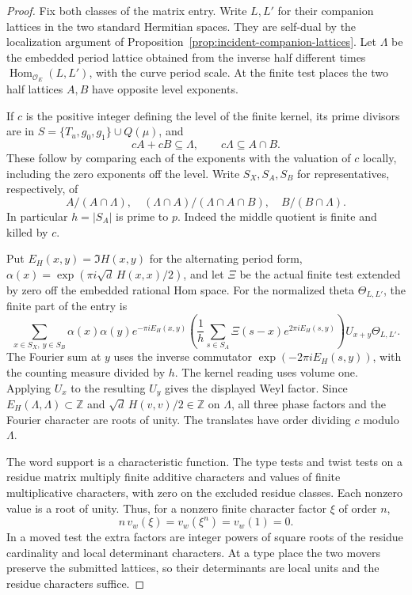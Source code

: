 \begin{proof}

Fix both classes of the matrix entry. Write \(L,L'\) for their
companion lattices in the two standard Hermitian spaces. They are
self-dual by the localization argument of
Proposition~\ref{prop:incident-companion-lattices}. Let \(\Lambda\) be the
embedded period lattice obtained from the inverse half different
times \(\operatorname{Hom}_{\mathcal O_E}(L,L')\), with the
curve period scale. At the finite test places the two half lattices
\(A,B\) have opposite level exponents.

If \(c\) is the positive
integer defining the level of the finite kernel, its prime divisors
are in \(S=\{T_u,g_0,g_1\}\cup Q(\mu)\), and
\[
 cA+cB\subseteq\Lambda,\qquad c\Lambda\subseteq A\cap B.
\]
These follow by comparing each of the exponents with the
valuation of \(c\) locally, including the zero exponents off the
level. Write \(S_X,S_A,S_B\) for representatives, respectively, of
\[
 A/(A\cap\Lambda),\quad
 (\Lambda\cap A)/(\Lambda\cap A\cap B),\quad
 B/(B\cap\Lambda).
\]
In particular \(h=|S_A|\) is prime to \(p\). Indeed the middle
quotient is finite and killed by \(c\).


Put \(E_H(x,y)=\Im H(x,y)\) for the alternating period form,
\(\alpha(x)=\exp(\pi i\sqrt d\, H(x,x)/2)\), and let
\(\Xi\) be the actual finite test extended by zero off the
embedded rational Hom space. For the normalized theta
\(\Theta_{L,L'}\), the finite part of the entry is
\begin{equation}\label{eq:unserved-reader}
 \sum_{x\in S_X,\ y\in S_B}
   \alpha(x)\alpha(y)e^{-\pi i E_H(x,y)}
   \left(\frac1h\sum_{s\in S_A}
      \Xi(s-x)e^{2\pi i E_H(s,y)}\right) U_{x+y}\Theta_{L,L'} .
\end{equation}
The Fourier sum at \(y\) uses the inverse commutator \(\exp(-2\pi i E_H(s,y))\), with the counting
measure divided by \(h\). The kernel reading uses volume one.
Applying \(U_x\) to the resulting \(U_y\) gives the displayed
Weyl factor. Since \(E_H(\Lambda,\Lambda)\subset\mathbb Z\)
and \(\sqrt d\,H(v,v)/2\in\mathbb Z\) on \(\Lambda\), all three
phase factors and the Fourier character are roots of unity.
The translates have order dividing \(c\) modulo \(\Lambda\).


The word support is
a characteristic function. The type tests and twist tests on
a residue matrix multiply finite additive characters and values
of finite multiplicative characters, with zero on the excluded
residue classes. Each nonzero value is a root of unity.
Thus, for a nonzero finite character factor \(\xi\) of order \(n\),
\[
  n\,v_w(\xi)=v_w(\xi^n)=v_w(1)=0 .
\]
 In a
moved test the extra factors are integer powers of square roots
of the residue cardinality and local determinant characters.
At a type place the two movers preserve the submitted lattices,
so their determinants are local units and the residue characters
suffice.


\end{proof}
